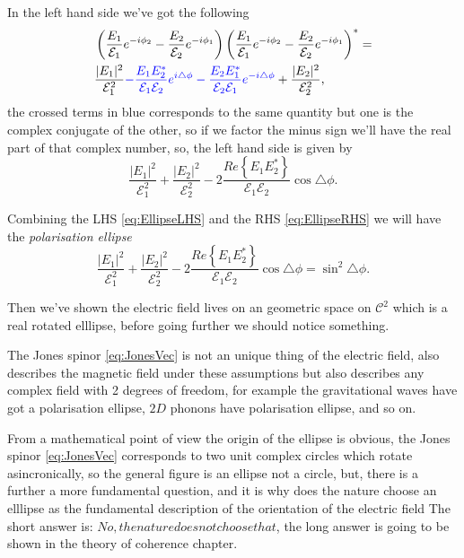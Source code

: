        In the left hand side we've got the following
        \begin{align*}
            & \left(\frac{E_1}{\mathcal{E}_1}e^{-i\phi_2} -  \frac{E_2}{\mathcal{E}_2}e^{-i\phi_1}\right)\left(\frac{E_1}{\mathcal{E}_1}e^{-i\phi_2} -  \frac{E_2}{\mathcal{E}_2}e^{-i\phi_1}\right)^* = \\
            & \frac{|E_1|^2}{\mathcal{E}_1^2} \text{\color{blue} $- \frac{E_1E_2^*}{\mathcal{E}_1\mathcal{E}_2}e^{i\triangle\phi} - \frac{E_2E_1^*}{\mathcal{E}_2\mathcal{E}_1}e^{-i\triangle\phi} $} + \frac{|E_2|^2}{\mathcal{E}_2^2},
        \end{align*}
        the crossed terms in blue corresponds to the same quantity but one is the complex conjugate of the other, so if we factor the minus sign we'll have the real part of that complex number, so, the left hand side is given by
        \begin{equation}\label{eq:EllipseLHS}
            \frac{|E_1|^2}{\mathcal{E}_1^2} + \frac{|E_2|^2}{\mathcal{E}_2^2} - 2\frac{Re\left\{E_1E_2^*\right\}}{\mathcal{E}_1\mathcal{E}_2}\cos\triangle\phi.
        \end{equation}

        Combining the LHS \ref{eq:EllipseLHS} and the RHS \ref{eq:EllipseRHS} we will have the \textit{polarisation ellipse}
        \begin{equation}\label{eq:EllipsePol}
            \frac{|E_1|^2}{\mathcal{E}_1^2} + \frac{|E_2|^2}{\mathcal{E}_2^2} - 2\frac{Re\left\{E_1E_2^*\right\}}{\mathcal{E}_1\mathcal{E}_2}\cos\triangle\phi = \sin^2\triangle\phi.
        \end{equation}

        Then we've shown the electric field lives on an geometric space on $\mathcal{C}^2$ which is a real rotated elllipse, before going further we should notice something. 

        The Jones spinor \ref{eq:JonesVec} is not an unique thing of the electric field, also describes the magnetic field under these assumptions but also describes any complex field with 2 degrees of freedom, for example the gravitational waves have got a polarisation ellipse, $2D$ phonons have polarisation ellipse, and so on. 

        From a mathematical point of view the origin of the ellipse is obvious, the Jones spinor \ref{eq:JonesVec} corresponds to two unit complex circles which rotate asincronically, so the general figure is an ellipse not a circle, but, there is a further a more fundamental question, and it is why does the nature choose an elllipse as the fundamental description of the orientation of the electric field The short answer is: $No, the nature does not choose that$, the long answer is going to be shown in the theory of coherence chapter.

